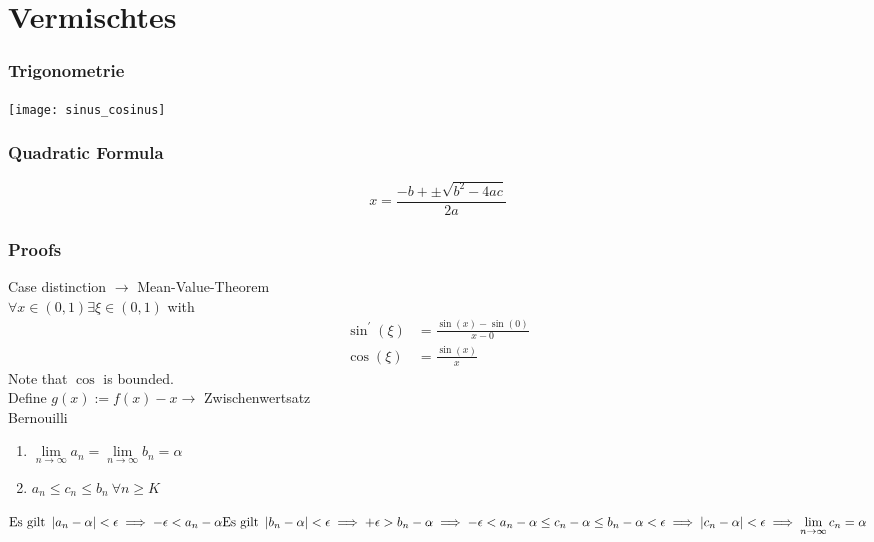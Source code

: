 \part{Vermischtes}
\setcounter{section}{0}

\section{Trigonometrie}
\texttt{[image: sinus\_cosinus]}

\section{Quadratic Formula}
\[ x = \frac{-b + \pm \sqrt{b^2 - 4 a c} }{2 a} \]

\section{Proofs}
\Beweis[$\sin(x) < x$] Case distinction $\rightarrow$ Mean-Value-Theorem \\
$\forall x \in (0,1) \exists \xi \in (0,1)$ with
\begin{align*}
\sin^{\prime}(\xi) &= \frac{\sin(x)-\sin(0)}{x-0} \\
\cos(\xi)		&= \frac{\sin(x)}{x}
\end{align*}
Note that $\cos$ is bounded. \\

\Beweis[Fixpunkt 6.4a] Define $g(x):=f(x)-x \rightarrow$ Zwischenwertsatz \\

\Beweis[$1+x \leq e^x$] Bernouilli \\

\Beweis[Sandwich]
\begin{enumerate}
\item $\lim\limits_{n \rightarrow \infty} a_{n} = \lim\limits_{n \rightarrow \infty} b_{n} = \alpha$ 
\item $a_{n} \leq c_{n} \leq b_{n} \ \forall n \geq K$
\end{enumerate}

\(
\text{Es gilt } \left\lvert a_n - \alpha \right\rvert < \epsilon \implies - \epsilon < a_n - \alpha \\
\text{Es gilt } \left\lvert b_n - \alpha \right\rvert < \epsilon \implies + \epsilon > b_n - \alpha \\
\implies - \epsilon < a_n - \alpha \leq c_n - \alpha \leq b_n - \alpha < \epsilon \\
\implies \left\lvert c_n - \alpha \right\rvert < \epsilon \implies \lim\limits_{n \rightarrow \infty} c_{n} = \alpha
\)

